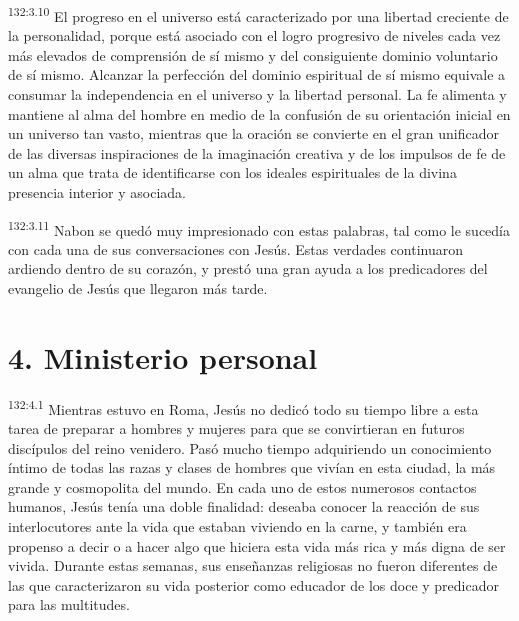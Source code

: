 \par
\textsuperscript{132:3.10} El progreso en el universo está caracterizado por una libertad creciente de la personalidad, porque está asociado con el logro progresivo de niveles cada vez más elevados de comprensión de sí mismo y del consiguiente dominio voluntario de sí mismo. Alcanzar la perfección del dominio espiritual de sí mismo equivale a consumar la independencia en el universo y la libertad personal. La fe alimenta y mantiene al alma del hombre en medio de la confusión de su orientación inicial en un universo tan vasto, mientras que la oración se convierte en el gran unificador de las diversas inspiraciones de la imaginación creativa y de los impulsos de fe de un alma que trata de identificarse con los ideales espirituales de la divina presencia interior y asociada.

\par
\textsuperscript{132:3.11} Nabon se quedó muy impresionado con estas palabras, tal como le sucedía con cada una de sus conversaciones con Jesús. Estas verdades continuaron ardiendo dentro de su corazón, y prestó una gran ayuda a los predicadores del evangelio de Jesús que llegaron más tarde.

\section*{4. Ministerio personal}
\par
\textsuperscript{132:4.1} Mientras estuvo en Roma, Jesús no dedicó todo su tiempo libre a esta tarea de preparar a hombres y mujeres para que se convirtieran en futuros discípulos del reino venidero. Pasó mucho tiempo adquiriendo un conocimiento íntimo de todas las razas y clases de hombres que vivían en esta ciudad, la más grande y cosmopolita del mundo. En cada uno de estos numerosos contactos humanos, Jesús tenía una doble finalidad: deseaba conocer la reacción de sus interlocutores ante la vida que estaban viviendo en la carne, y también era propenso a decir o a hacer algo que hiciera esta vida más rica y más digna de ser vivida. Durante estas semanas, sus enseñanzas religiosas no fueron diferentes de las que caracterizaron su vida posterior como educador de los doce y predicador para las multitudes.

